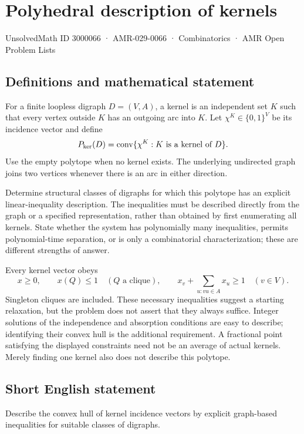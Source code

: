 \documentclass[11pt,a4paper]{article}
\begin{document}
\section*{Polyhedral description of kernels}\label{3000066}
{\small UnsolvedMath ID 3000066 · AMR-029-0066 · Combinatorics · AMR Open Problem Lists}
\subsection{Definitions and mathematical statement}
For a finite loopless digraph $D=(V,A)$, a kernel is an independent
set $K$ such that every vertex outside $K$ has an outgoing arc into
$K$. Let $\chi^K\in\{0,1\}^V$ be its incidence vector and define
\[
 P_{\rm ker}(D)=\operatorname{conv}\{\chi^K:K\text{ is a kernel of }D\}.
\]
Use the empty polytope when no kernel exists. The underlying undirected
graph joins two vertices whenever there is an arc in either direction.

Determine structural classes of digraphs for which this polytope has
an explicit linear-inequality description. The inequalities must be
described directly from the graph or a specified representation,
rather than obtained by first enumerating all kernels. State whether
the system has polynomially many inequalities, permits polynomial-time
separation, or is only a combinatorial characterization; these are
different strengths of answer.

Every kernel vector obeys
\[
 x\ge0,\qquad x(Q)\le1\quad(Q\text{ a clique}),\qquad
 x_v+\sum_{u:vu\in A}x_u\ge1\quad(v\in V).
\]
Singleton cliques are included. These necessary inequalities suggest
a starting relaxation, but the problem does not assert that they
always suffice. Integer solutions of the independence and absorption
conditions are easy to describe; identifying their convex hull is the
additional requirement. A fractional point satisfying the displayed
constraints need not be an average of actual kernels. Merely finding
one kernel also does not describe this polytope.
\subsection{Short English statement}
Describe the convex hull of kernel incidence vectors by explicit graph-based inequalities for suitable classes of digraphs.
\end{document}
